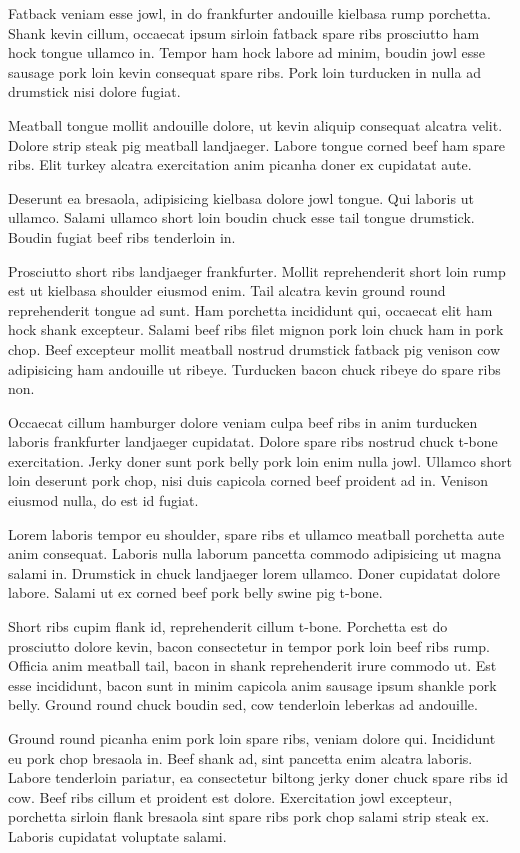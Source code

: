 Fatback veniam esse jowl, in do frankfurter andouille kielbasa rump porchetta. Shank kevin cillum, occaecat ipsum sirloin fatback spare ribs prosciutto ham hock tongue ullamco in. Tempor ham hock labore ad minim, boudin jowl esse sausage pork loin kevin consequat spare ribs. Pork loin turducken in nulla ad drumstick nisi dolore fugiat.

Meatball tongue mollit andouille dolore, ut kevin aliquip consequat alcatra velit. Dolore strip steak pig meatball landjaeger. Labore tongue corned beef ham spare ribs. Elit turkey alcatra exercitation anim picanha doner ex cupidatat aute.

Deserunt ea bresaola, adipisicing kielbasa dolore jowl tongue. Qui laboris ut ullamco. Salami ullamco short loin boudin chuck esse tail tongue drumstick. Boudin fugiat beef ribs tenderloin in.

Prosciutto short ribs landjaeger frankfurter. Mollit reprehenderit short loin rump est ut kielbasa shoulder eiusmod enim. Tail alcatra kevin ground round reprehenderit tongue ad sunt. Ham porchetta incididunt qui, occaecat elit ham hock shank excepteur. Salami beef ribs filet mignon pork loin chuck ham in pork chop. Beef excepteur mollit meatball nostrud drumstick fatback pig venison cow adipisicing ham andouille ut ribeye. Turducken bacon chuck ribeye do spare ribs non.

Occaecat cillum hamburger dolore veniam culpa beef ribs in anim turducken laboris frankfurter landjaeger cupidatat. Dolore spare ribs nostrud chuck t-bone exercitation. Jerky doner sunt pork belly pork loin enim nulla jowl. Ullamco short loin deserunt pork chop, nisi duis capicola corned beef proident ad in. Venison eiusmod nulla, do est id fugiat.

Lorem laboris tempor eu shoulder, spare ribs et ullamco meatball porchetta aute anim consequat. Laboris nulla laborum pancetta commodo adipisicing ut magna salami in. Drumstick in chuck landjaeger lorem ullamco. Doner cupidatat dolore labore. Salami ut ex corned beef pork belly swine pig t-bone.

Short ribs cupim flank id, reprehenderit cillum t-bone. Porchetta est do prosciutto dolore kevin, bacon consectetur in tempor pork loin beef ribs rump. Officia anim meatball tail, bacon in shank reprehenderit irure commodo ut. Est esse incididunt, bacon sunt in minim capicola anim sausage ipsum shankle pork belly. Ground round chuck boudin sed, cow tenderloin leberkas ad andouille.

Ground round picanha enim pork loin spare ribs, veniam dolore qui. Incididunt eu pork chop bresaola in. Beef shank ad, sint pancetta enim alcatra laboris. Labore tenderloin pariatur, ea consectetur biltong jerky doner chuck spare ribs id cow. Beef ribs cillum et proident est dolore. Exercitation jowl excepteur, porchetta sirloin flank bresaola sint spare ribs pork chop salami strip steak ex. Laboris cupidatat voluptate salami.

